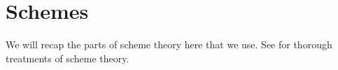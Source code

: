 \section{Schemes}
We will recap the parts of scheme theory here that we use.
See \cite{vakil,HAG} for thorough treatments of scheme theory.



%










